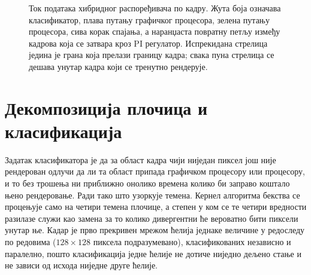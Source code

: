 \documentclass[serbian]{ftndiplomski}
\begin{document}
\begin{figure}[H]
{%
  }
  \caption{Ток података хибридног распоређивача по кадру. Жута боја означава
  класификатор, плава путању графичког процесора, зелена путању процесора, сива корак
  спајања, а наранџаста повратну петљу између кадрова која се затвара кроз PI
  регулатор. Испрекидана стрелица једина је грана која прелази границу кадра; свака
  пуна стрелица се дешава унутар кадра који се тренутно рендерује.}
  \label{fig:scheduler-diagram}
\end{figure}

\section{Декомпозиција плочица и класификација}
\label{sec:tile-decomposition}

Задатак класификатора је да за област кадра чији ниједан пиксел још није рендерован
одлучи да ли та област припада графичком процесору или процесору, и то без трошења ни
приближно онолико времена колико би заправо коштало њено рендеровање. Ради тако што
узоркује темена. Кернел алгоритма бекства се процењује само на четири темена плочице,
а степен у ком се те четири вредности разилазе служи као замена за то колико
дивергентни ће вероватно бити пиксели унутар ње. Кадар је прво прекривен мрежом
ћелија једнаке величине у редоследу по редовима ($128 \times 128$ пиксела
подразумевано), класификованих независно и паралелно, пошто класификација једне
ћелије не дотиче ниједно дељено стање и не зависи од исхода ниједне друге ћелије.
\end{document}
